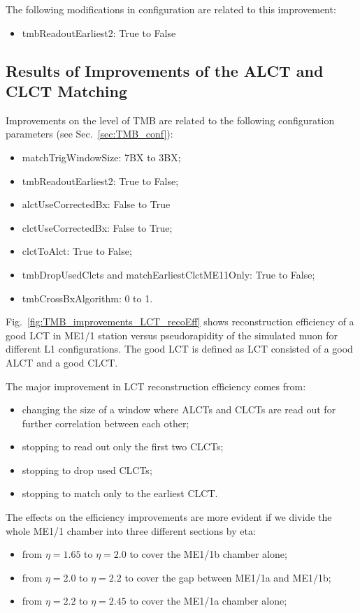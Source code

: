 The following modifications in configuration are related to this improvement:
\begin{itemize}
    \item tmbReadoutEarliest2: True to False
\end{itemize}


\subsection{Results of Improvements of the ALCT and CLCT Matching}

Improvements on the level of TMB are related to the following configuration parameters (see Sec.~\ref{sec:TMB_conf}):
\begin{itemize}
	\item matchTrigWindowSize: 7BX to 3BX;
	\item tmbReadoutEarliest2: True to False;
	\item alctUseCorrectedBx: False to True
	\item clctUseCorrectedBx: False to True;
	\item clctToAlct: True to False;
	\item tmbDropUsedClcts and matchEarliestClctME11Only: True to False;
	\item tmbCrossBxAlgorithm: 0 to 1.
\end{itemize}

Fig.~\ref{fig:TMB_improvements_LCT_recoEff} shows reconstruction efficiency of a good LCT in ME1/1 station versus pseudorapidity of the simulated muon for different L1 configurations. The good LCT is defined as LCT consisted of a good ALCT and a good CLCT.

The major improvement in LCT reconstruction efficiency comes from:
\begin{itemize}
	\item changing the size of a window where ALCTs and CLCTs are read out for further correlation between each other;
	\item stopping to read out only the first two CLCTs;
	\item stopping to drop used CLCTs;
	\item stopping to match only to the earliest CLCT.
\end{itemize}

The effects on the efficiency improvements are more evident if we divide the whole ME1/1 chamber into three different sections by eta:
\begin{itemize}
        \item from $ \eta = 1.65 $ to $ \eta = 2.0 $ to cover the ME1/1b chamber alone;
        \item from $ \eta = 2.0 $ to $ \eta = 2.2 $ to cover the gap between ME1/1a and ME1/1b;
        \item from $ \eta = 2.2 $ to $\eta = 2.45 $ to cover the ME1/1a chamber alone;
\end{itemize}

